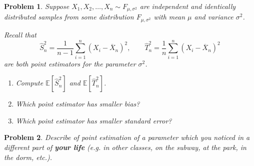 \documentclass{article}
\newtheorem{problem}{Problem}
\newcommand{\EE}{\mathbb{E}}
\begin{document}
\begin{problem}
    Suppose $X_1, X_2, \ldots, X_n \sim F_{\mu,\sigma^2}$ are independent and identically distributed samples from some distribution $F_{\mu,\sigma^2}$ with mean $\mu$ and variance $\sigma^2$.

    Recall that 
    \begin{equation*}
        \hat{S}_n^2 = \frac{1}{n-1} \sum_{i=1}^{n} (X_i - \overline{X}_n)^2
        ,\qquad
        \hat{T}_n^2 = \frac{1}{n} \sum_{i=1}^{n} (X_i - \overline{X}_n)^2
    \end{equation*}
    are both point estimators for the parameter $\sigma^2$.

    \begin{enumerate}[label=(\alph*),topsep=0pt]
        \item Compute $\EE[\hat{S}_n^2]$ and $\EE[\hat{T}_n^2]$.
        \item Which point estimator has smaller bias?
        \item Which point estimator has smaller standard error?
    \end{enumerate}
\end{problem}

\begin{problem}
Describe of point estimation of a parameter which you noticed in a different part of \textbf{your life} (e.g. in other classes, on the subway, at the park, in the dorm, etc.).
\end{problem}
\end{document}
